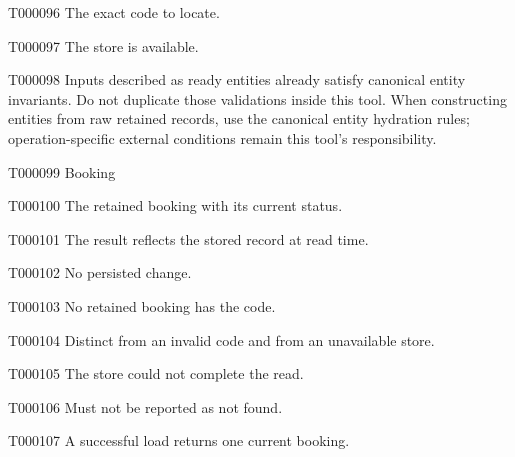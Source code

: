 \documentclass[11pt,a4paper]{article}
\begin{document}
\begin{atlasparagraph}{T000096}
The exact code to locate.
\end{atlasparagraph}
\begin{atlasparagraph}{T000097}
The store is available.
\end{atlasparagraph}
\begin{atlasparagraph}{T000098}
Inputs described as ready entities already satisfy canonical entity invariants. Do not duplicate those validations inside this tool. When constructing entities from raw retained records, use the canonical entity hydration rules; operation-specific external conditions remain this tool's responsibility.
\end{atlasparagraph}
\begin{atlastext}{T000099}
Booking
\end{atlastext}
\begin{atlasparagraph}{T000100}
The retained booking with its current status.
\end{atlasparagraph}
\begin{atlasparagraph}{T000101}
The result reflects the stored record at read time.
\end{atlasparagraph}
\begin{atlasparagraph}{T000102}
No persisted change.
\end{atlasparagraph}
\begin{atlasparagraph}{T000103}
No retained booking has the code.
\end{atlasparagraph}
\begin{atlasparagraph}{T000104}
Distinct from an invalid code and from an unavailable store.
\end{atlasparagraph}
\begin{atlasparagraph}{T000105}
The store could not complete the read.
\end{atlasparagraph}
\begin{atlasparagraph}{T000106}
Must not be reported as not found.
\end{atlasparagraph}
\begin{atlasparagraph}{T000107}
A successful load returns one current booking.
\end{atlasparagraph}
\end{document}
